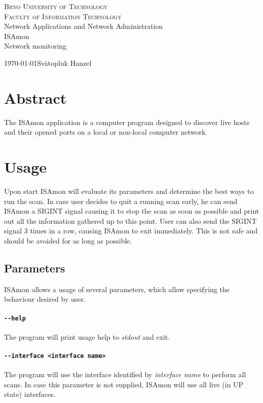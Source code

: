 \documentclass[11pt,a4paper]{article}
\begin{document}
\begin{titlepage}
	\begin{center}
	    {\LARGE\textsc{Brno University of Technology}}\\
	    \smallskip
	    {\Large\textsc{Faculty of Information Technology}}\\
	    \bigskip
	    \LARGE{Network Applications and Network Administration}\\
	    \smallskip
		\Huge{ISAmon}\\
		\huge{Network monitoring}
	\end{center}
    {\today \hfill Svätopluk Hanzel}
\end{titlepage}

\tableofcontents

\newpage
\section*{Abstract}
	The ISAmon application is a computer program designed to discover live hosts and their opened ports on a local or non-local computer network.
\newpage

\section{Usage}
	Upon start ISAmon will evaluate its parameters and determine the best ways to run the scan. In case user decides to quit a running scan early, he can send ISAmon a SIGINT signal causing it to stop the scan as soon as possible and print out all the information gathered up to this point. User can also send the SIGINT signal 3 times in a row, causing ISAmon to exit immediately. This is not safe and should be avoided for as long as possible.

	\subsection{Parameters}
		ISAmon allows a usage of several parameters, which allow specifying the behaviour desired by user.
		\paragraph{\texttt{-{}-help}} The program will print usage help to \emph{stdout} and exit.
		\vspace{-0.5cm}
		\paragraph{\texttt{-{}-interface <interface name>}} The program will use the interface identified by \emph{interface name} to perform all scans. In case this parameter is not supplied, ISAmon will use all live (in UP state) interfaces.
		\vspace{-0.5cm}
\end{document}
